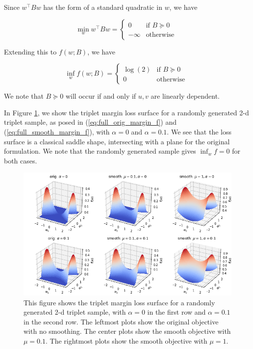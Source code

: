 \documentclass[11pt]{article}
\begin{document}
Since $w^{\top}Bw$ has the form of a standard quadratic in $w$, we have

\begin{equation}
    \min_{w} w^{\top}Bw = \begin{cases} 
    0 &\mbox{if } B \succeq 0 \\
    -\infty & \mbox{otherwise } \end{cases}
\end{equation}

Extending this to $f(w; B)$, we have

\begin{equation}
    \inf_{w} f(w; B) = \begin{cases} 
    \log(2) &\mbox{if } B \succeq 0 \\
    0 & \mbox{otherwise } \end{cases}
\end{equation}

We note that $B \succeq 0$ will occur if and only if $u, v$ are linearly dependent.

In Figure \ref{fig:triplet_viz}, we show the triplet margin loss surface for a randomly generated 2-d triplet sample, as posed in (\ref{eq:full_orig_margin_f}) and (\ref{eq:full_smooth_margin_f}), with $\alpha=0$ and $\alpha=0.1$. We see that the loss surface is a classical saddle shape, intersecting with a plane for the original formulation. We note that the randomly generated sample gives $\inf_{w} f=0$ for both cases.

\begin{figure}
  \centering
  \includegraphics[width=\textwidth]{figures/triplet_viz.png}
  
  \caption{\label{fig:triplet_viz}This figure shows the triplet margin loss surface for a randomly generated 2-d triplet sample, with $\alpha = 0$ in the first row and $\alpha = 0.1$ in the second row. The leftmost plots show the original objective with no smoothing. The center plots show the smooth objective with $\mu=0.1$. The rightmost plots show the smooth objective with $\mu=1$. }
\end{figure}
\end{document}
